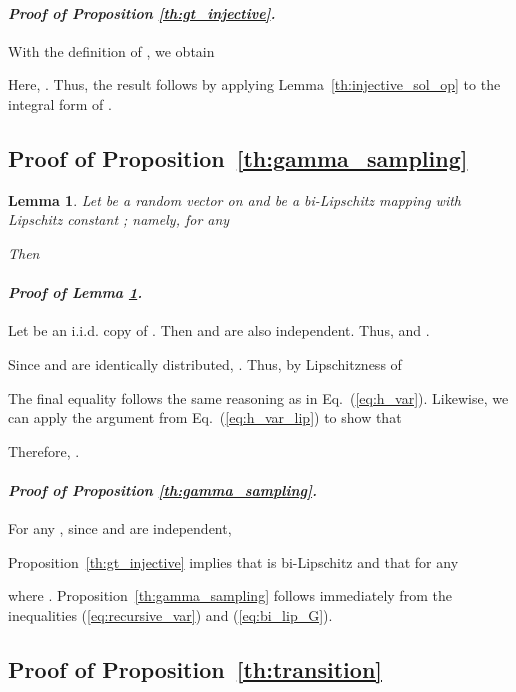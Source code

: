 \documentclass{article} \usepackage{iclr2024_coNFErence,times}
\def\eqref#1{equation~\ref{#1}}
\newenvironment{myproof}[2]{\paragraph{\textit{Proof of {#1} {#2}. }}}{\hfill}
\def\eqref#1{(\ref{#1})}
\def\eqref#1{(\ref{#1})}
\newtheorem{lemma}[theorem]{Lemma}
\theoremstyle{definition}
\theoremstyle{remark}
\begin{document}
\begin{myproof}{Proposition}{\ref{th:gt_injective}} With the definition of , we obtain

Here, . Thus, the result follows by applying Lemma~\ref{th:injective_sol_op} to the integral form of .

\end{myproof}






\subsection{Proof of Proposition~\ref{th:gamma_sampling}}




\begin{lemma}\label{th:Lip_var}
    Let  be a random vector on  and  be a bi-Lipschitz mapping with Lipschitz constant ; namely, for any 
    
    Then 
    
\end{lemma}

\begin{myproof}{Lemma}{\ref{th:Lip_var}}
    Let  be an i.i.d. copy of . Then  and  are also independent. Thus,  and .
    
    Since  and  are identically distributed, .
    Thus, by Lipschitzness of 
        
    The final equality follows the same reasoning as in Eq.~\eqref{eq:h_var}. Likewise, we can apply the argument from Eq.~\eqref{eq:h_var_lip} to show that
    
    Therefore, .
\end{myproof}


\begin{myproof}{Proposition}{\ref{th:gamma_sampling}}
For any , since  and  are independent,

Proposition~\ref{th:gt_injective} implies that  is bi-Lipschitz and that for any 

where . Proposition~\ref{th:gamma_sampling} follows immediately from the inequalities \eqref{eq:recursive_var} and \eqref{eq:bi_lip_G}.
\end{myproof}


\subsection{Proof of Proposition~\ref{th:transition}}
\end{document}
